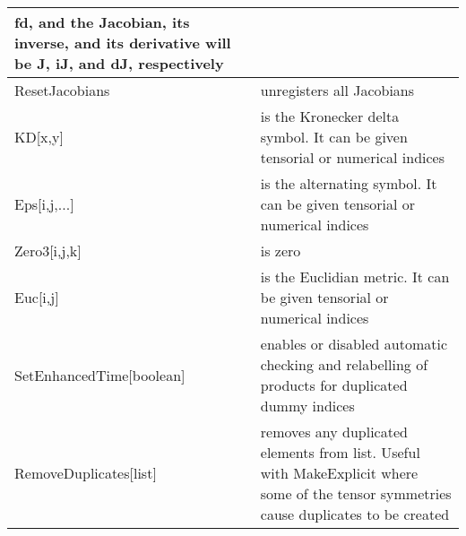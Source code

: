 \documentclass{report}
\newcommand{\tablewidth}{\textwidth}
\begin{document}
\begin{center}
\begin{tabularx}{\tablewidth}{|l|X|}
    fd, and the Jacobian, its inverse, and its derivative will be J,
    iJ, and dJ, respectively\\
    \hline
    ResetJacobians & unregisters all Jacobians\\
    \hline
    KD[x,y] &
    is the Kronecker delta symbol.  It can be given tensorial or
    numerical indices\\
    \hline
    Eps[i,j,...] &
    is the alternating symbol.  It can be given tensorial or numerical
    indices\\
    \hline
    Zero3[i,j,k] &
    is zero\\
    \hline
    Euc[i,j] &
    is the Euclidian metric.  It can be given tensorial or numerical
    indices\\
    \hline
    SetEnhancedTime[boolean] &
    enables or disabled automatic checking and relabelling of products
    for duplicated dummy indices\\
    \hline
    RemoveDuplicates[list] &
    removes any duplicated elements from list.  Useful with
    MakeExplicit where some of the tensor symmetries cause duplicates
    to be created\\
    \hline
  \end{tabularx}
\end{center}
\end{document}
